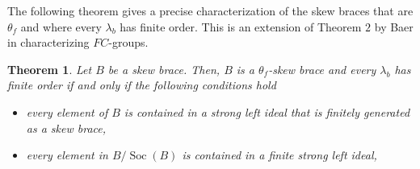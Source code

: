 \documentclass{amsart}
\newcommand{\Soc}{\operatorname{Soc}}
\newtheorem{thm}{Theorem}[section]
\begin{document}
The following theorem gives a precise characterization of the skew braces that are $\theta_f$ and where every $\lambda_b$ has finite order. This is an extension of Theorem $2$ by Baer in \cite{FC} characterizing $FC$-groups.
\begin{thm}\label{satisfacttheorem}
    Let $B$ be a skew brace. Then, $B$ is a $\theta_f$-skew brace and every $\lambda_b$ has finite order if and only if the following conditions hold 

    \begin{itemize}
        \item every element of $B$ is contained in a strong left ideal that is finitely generated as a skew brace,
        \item every element in $B/\Soc(B)$ is contained in a finite strong left ideal,
    \end{itemize}
\end{thm}
\end{document}
